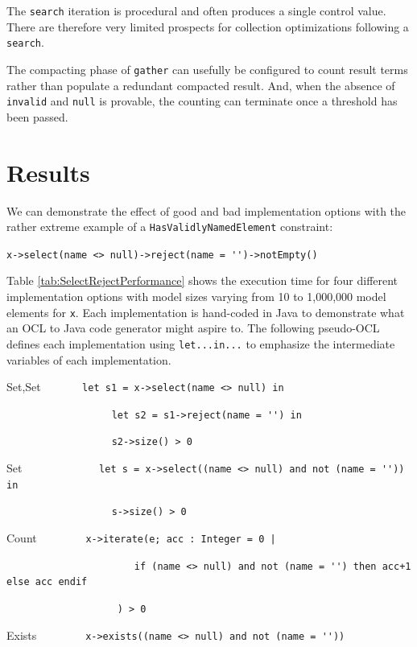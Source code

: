 \documentclass[
]{ceurart}
\begin{document}
The \verb!search! iteration is procedural and often produces a single control value. There are therefore very limited prospects for collection optimizations following a \verb!search!.

The compacting phase of \verb!gather! can usefully be configured to count result terms rather than populate a redundant compacted result. And, when the absence of \verb!invalid! and \verb!null! is provable, the counting can terminate once a threshold has been passed.

\section{Results}\label{Results}

We can demonstrate the effect of good and bad implementation options with the rather extreme example of a \verb!HasValidlyNamedElement! constraint: 
\begin{description}[itemsep=-0.2cm]\small
\item \verb!x->select(name <> null)->reject(name = '')->notEmpty()!
\end{description}

Table \ref{tab:SelectRejectPerformance} shows the execution time for four different implementation options with model sizes varying from 10 to 1,000,000 model elements for \verb!x!. Each implementation is hand-coded in Java to demonstrate what an OCL to Java code generator might aspire to. The following pseudo-OCL defines each implementation using \verb!let...in...! to emphasize the intermediate variables of each implementation.

\begin{description}[itemsep=-0.2cm]\small\begin{samepage}
\item Set,Set ~~~~~~ \verb!let s1 = x->select(name <> null) in!
\item ~~~~~~~~~~~~~~~~~~ \verb!let s2 = s1->reject(name = '') in!
\item ~~~~~~~~~~~~~~~~~~ \verb!s2->size() > 0!
\item Set~~~~~~~~~~~~~ \verb!let s = x->select((name <> null) and not (name = '')) in!
\item ~~~~~~~~~~~~~~~~~~ \verb!s->size() > 0!
\item Count~~~~~~~~ \verb!x->iterate(e; acc : Integer = 0 |!
\item ~~~~~~~~~~~~~~~~~~~~~ \verb! if (name <> null) and not (name = '') then acc+1 else acc endif!
\item ~~~~~~~~~~~~~~~~~~~ \verb!) > 0!
\item Exists~~~~~~~ \verb! x->exists((name <> null) and not (name = ''))!
\end{samepage}\end{description}
\end{document}
